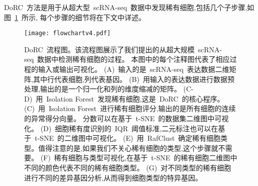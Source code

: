 DoRC~方法是用于从超大型~scRNA-seq~数据中发现稀有细胞,包括几个子步骤,如图~\ref{fig:flowchart}~所示, 每个步骤的细节将在下文中详述。
\begin{figure}[!htbp]
    \centering
    \texttt{[image: flowchartv4.pdf]}
    \caption{DoRC~流程图。该流程图展示了我们提出的从超大规模~scRNA-seq~数据中检测稀有细胞的过程。
    本图中的每个注释图代表了相应过程的输入或输出可视化。
    (A)~输入的是~scRNA-seq~表达数据二维矩阵,其中行代表细胞,列代表基因。
    (B)~用输入的表达数据进行数据预处理,输出的是一个归一化和列的维度缩减的矩阵。
    (C-D)~用~Isolation Forest~发现稀有细胞,这是~DoRC~的核心程序。
    (C)~用~Isolation Forest~进行稀有细胞评分,输出的是所有细胞的连续的异常得分向量。
    分数可以在基于~t-SNE~的数据集二维图中可视化。
    (D)~细胞稀有度识别的~IQR~阈值标准,二元标注也可以在基于~t-SNE~的二维图中可视化。
    (E)~用~RafClust~确定稀有细胞类型。值得注意的是,如果我们不关心稀有细胞的类型,这个步骤就不需要。
    (F)~稀有细胞与类型可视化,在基于~t-SNE~的稀有细胞二维图中不同的颜色代表不同的稀有细胞类型。
    (G)~对不同类型的稀有细胞进行不同的差异基因分析,从而得到细胞类型的特异基因。
    }
    \label{fig:flowchart}
\end{figure}

